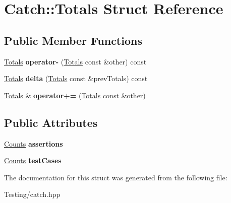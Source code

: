 \hypertarget{struct_catch_1_1_totals}{\section{Catch\-:\-:Totals Struct Reference}
\label{struct_catch_1_1_totals}
}
\subsection*{Public Member Functions}
\begin{DoxyCompactItemize}
\item 
\hypertarget{struct_catch_1_1_totals_abe15cd8a82ba9a4868dd7a542add827c}{\hyperlink{struct_catch_1_1_totals}{Totals} {\bfseries operator-\/} (\hyperlink{struct_catch_1_1_totals}{Totals} const \&other) const }\label{struct_catch_1_1_totals_abe15cd8a82ba9a4868dd7a542add827c}

\item 
\hypertarget{struct_catch_1_1_totals_a3dee0f599c081a8360c0112fb1dafe8f}{\hyperlink{struct_catch_1_1_totals}{Totals} {\bfseries delta} (\hyperlink{struct_catch_1_1_totals}{Totals} const \&prev\-Totals) const }\label{struct_catch_1_1_totals_a3dee0f599c081a8360c0112fb1dafe8f}

\item 
\hypertarget{struct_catch_1_1_totals_a574015076e54cc405c70b053e3356e43}{\hyperlink{struct_catch_1_1_totals}{Totals} \& {\bfseries operator+=} (\hyperlink{struct_catch_1_1_totals}{Totals} const \&other)}\label{struct_catch_1_1_totals_a574015076e54cc405c70b053e3356e43}

\end{DoxyCompactItemize}
\subsection*{Public Attributes}
\begin{DoxyCompactItemize}
\item 
\hypertarget{struct_catch_1_1_totals_a885ded66df752147b30c3d45aa602ec9}{\hyperlink{struct_catch_1_1_counts}{Counts} {\bfseries assertions}}\label{struct_catch_1_1_totals_a885ded66df752147b30c3d45aa602ec9}

\item 
\hypertarget{struct_catch_1_1_totals_adb195fe477aedee2ecea88c888f16506}{\hyperlink{struct_catch_1_1_counts}{Counts} {\bfseries test\-Cases}}\label{struct_catch_1_1_totals_adb195fe477aedee2ecea88c888f16506}

\end{DoxyCompactItemize}


The documentation for this struct was generated from the following file\-:\begin{DoxyCompactItemize}
\item 
Testing/catch.\-hpp\end{DoxyCompactItemize}
